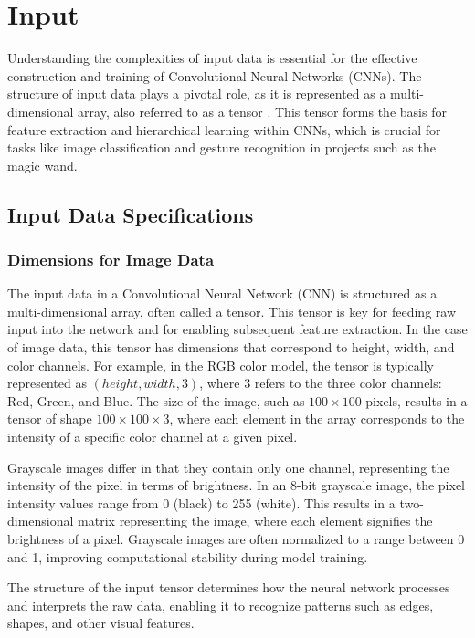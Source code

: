 \section{Input}

Understanding the complexities of input data is essential for the effective construction and training of Convolutional Neural Networks (CNNs). The structure of input data plays a pivotal role, as it is represented as a multi-dimensional array, also referred to as a tensor \cite{Xu:2022}. This tensor forms the basis for feature extraction and hierarchical learning within CNNs, which is crucial for tasks like image classification and gesture recognition in projects such as the magic wand.

\subsection{Input Data Specifications}

\subsubsection{Dimensions for Image Data}

The input data in a Convolutional Neural Network (CNN) is structured as a multi-dimensional array, often called a tensor. This tensor is key for feeding raw input into the network and for enabling subsequent feature extraction. In the case of image data, this tensor has dimensions that correspond to height, width, and color channels. For example, in the RGB color model, the tensor is typically represented as $(height, width, 3)$, where $3$ refers to the three color channels: Red, Green, and Blue. The size of the image, such as $100 \times 100$ pixels, results in a tensor of shape $100 \times 100 \times 3$, where each element in the array corresponds to the intensity of a specific color channel at a given pixel.

Grayscale images differ in that they contain only one channel, representing the intensity of the pixel in terms of brightness. In an 8-bit grayscale image, the pixel intensity values range from 0 (black) to 255 (white). This results in a two-dimensional matrix representing the image, where each element signifies the brightness of a pixel. Grayscale images are often normalized to a range between 0 and 1, improving computational stability during model training.

The structure of the input tensor determines how the neural network processes and interprets the raw data, enabling it to recognize patterns such as edges, shapes, and other visual features.

